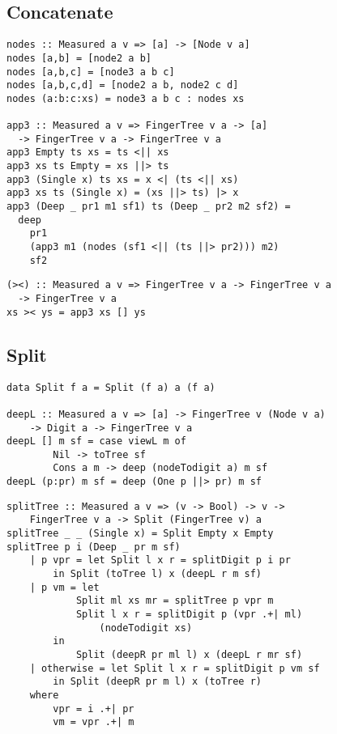 \subsection{Concatenate}
\begin{frame}[fragile]
  \begin{verbatim}
nodes :: Measured a v => [a] -> [Node v a]
nodes [a,b] = [node2 a b]
nodes [a,b,c] = [node3 a b c]
nodes [a,b,c,d] = [node2 a b, node2 c d]
nodes (a:b:c:xs) = node3 a b c : nodes xs

app3 :: Measured a v => FingerTree v a -> [a]
  -> FingerTree v a -> FingerTree v a
app3 Empty ts xs = ts <|| xs
app3 xs ts Empty = xs ||> ts
app3 (Single x) ts xs = x <| (ts <|| xs)
app3 xs ts (Single x) = (xs ||> ts) |> x
app3 (Deep _ pr1 m1 sf1) ts (Deep _ pr2 m2 sf2) =
  deep
    pr1 
    (app3 m1 (nodes (sf1 <|| (ts ||> pr2))) m2)
    sf2
  \end{verbatim}
\end{frame}

\begin{frame}[fragile]
  \begin{verbatim}
(><) :: Measured a v => FingerTree v a -> FingerTree v a
  -> FingerTree v a
xs >< ys = app3 xs [] ys
  \end{verbatim}
\end{frame}

\subsection{Split}
\begin{frame}[fragile]
\begin{verbatim}
data Split f a = Split (f a) a (f a)

deepL :: Measured a v => [a] -> FingerTree v (Node v a)
    -> Digit a -> FingerTree v a
deepL [] m sf = case viewL m of
        Nil -> toTree sf
        Cons a m -> deep (nodeTodigit a) m sf
deepL (p:pr) m sf = deep (One p ||> pr) m sf
\end{verbatim}
\end{frame}

\begin{frame}[fragile]
\begin{verbatim}
splitTree :: Measured a v => (v -> Bool) -> v ->
    FingerTree v a -> Split (FingerTree v) a
splitTree _ _ (Single x) = Split Empty x Empty
splitTree p i (Deep _ pr m sf)
    | p vpr = let Split l x r = splitDigit p i pr 
        in Split (toTree l) x (deepL r m sf)
    | p vm = let
            Split ml xs mr = splitTree p vpr m
            Split l x r = splitDigit p (vpr .+| ml)
                (nodeTodigit xs)
        in
            Split (deepR pr ml l) x (deepL r mr sf)
    | otherwise = let Split l x r = splitDigit p vm sf
        in Split (deepR pr m l) x (toTree r)
    where
        vpr = i .+| pr
        vm = vpr .+| m
\end{verbatim}
\end{frame}

